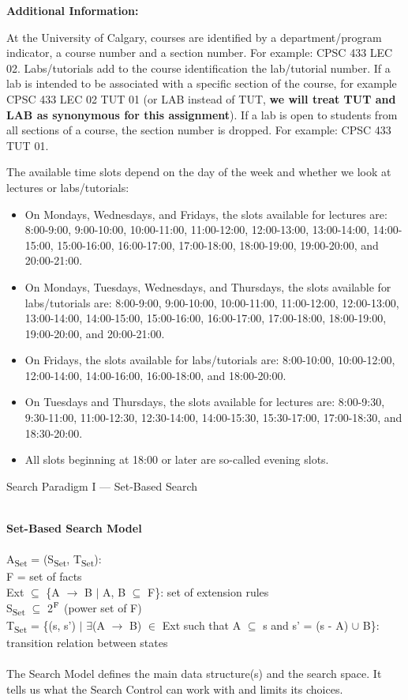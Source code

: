 \documentclass[10pt, oneside]{article}   	%
\begin{document}
\noindent \textbf{Additional Information:}
\par At the University of Calgary, courses are identified by a department/program indicator, a course number and a section number. For example: CPSC 433 LEC 02. Labs/tutorials add to the course identification the lab/tutorial number. If a lab is intended to be associated with a specific section of the course, for example CPSC 433 LEC 02 TUT 01 (or LAB instead of TUT, \textbf{we will treat TUT and LAB as synonymous for this assignment}). If a lab is open to students from all sections of a course, the section number is dropped. For example: CPSC 433 TUT 01.
\par The available time slots depend on the day of the week and whether we look at lectures or labs/tutorials:
\begin{itemize}[topsep=0pt, itemsep=0pt]
\item On Mondays, Wednesdays, and Fridays, the slots available for lectures are: 8:00-9:00, 9:00-10:00, 10:00-11:00, 11:00-12:00, 12:00-13:00, 13:00-14:00, 14:00-15:00, 15:00-16:00, 16:00-17:00, 17:00-18:00, 18:00-19:00, 19:00-20:00, and 20:00-21:00.
\item On Mondays, Tuesdays, Wednesdays, and Thursdays, the slots available for labs/tutorials are: 8:00-9:00, 9:00-10:00, 10:00-11:00, 11:00-12:00, 12:00-13:00, 13:00-14:00, 14:00-15:00, 15:00-16:00, 16:00-17:00, 17:00-18:00, 18:00-19:00, 19:00-20:00, and 20:00-21:00.
\item On Fridays, the slots available for labs/tutorials are: 8:00-10:00, 10:00-12:00, 12:00-14:00, 14:00-16:00, 16:00-18:00, and 18:00-20:00.
\item On Tuesdays and Thursdays, the slots available for lectures are: 8:00-9:30, 9:30-11:00, 11:00-12:30, 12:30-14:00, 14:00-15:30, 15:30-17:00, 17:00-18:30, and 18:30-20:00.
\item All slots beginning at 18:00 or later are so-called evening slots.
\end{itemize}
\newpage

\centerline{{\Large Search Paradigm I --- Set-Based Search}}
\noindent \textbf{\\Set-Based Search Model}\\\\
A\textsubscript{Set} = (S\textsubscript{Set}, T\textsubscript{Set}):\\
\indent F = set of facts\\
\indent Ext $\subseteq$ \{A $\rightarrow$ B $\vert$ A, B $\subseteq$ F\}: set of extension rules\\
\indent S\textsubscript{Set} $\subseteq$ 2$\textsuperscript{F}$ (power set of F)\\
\indent T\textsubscript{Set} = \{(s, s') $\vert$ $\exists$(A $\rightarrow$ B) $\in$ Ext such that A $\subseteq$ s and s' = (s - A) $\cup$ B\}:  transition relation between states\\\\
\noindent The Search Model defines the main data structure(s) and the search space. It tells us what the Search Control can work with and limits its choices.\\
\end{document}
